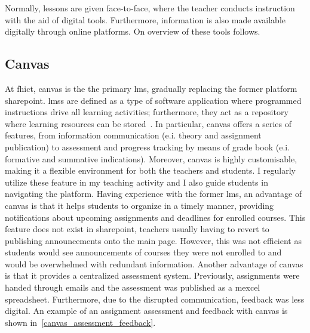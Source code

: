Normally, lessons are given face-to-face, where the teacher conducts instruction with the aid of digital tools. 
Furthermore, information is also made available digitally through online platforms.   
On overview of these tools follows.

\subsection{Canvas}

At \acrshort{fhict}, \Gls{canvas} is the the primary \acrfull{lms}, gradually replacing the former platform \Gls{sharepoint}. 
\acrshort{lms}s are defined as a type of software application where programmed instructions drive all learning activities; furthermore, they act as a repository where learning resources can be stored~\cite{lms2020}. 
In particular, \Gls{canvas} offers a series of features, from information communication (e.i. theory and assignment publication) to assessment and progress tracking by means of grade book (e.i. formative and summative indications). 
Moreover, \Gls{canvas} is highly customisable, making it a flexible environment for both the teachers and students.
I regularly utilize these feature in my teaching activity and I also guide students in navigating the platform. 
Having experience with the former \acrshort{lms}, an advantage of \Gls{canvas} is that it helps students to organize in a timely manner, providing notifications about upcoming assignments and deadlines for enrolled courses. 
This feature does not exist in \Gls{sharepoint}, teachers usually having to revert to publishing announcements onto the main page. 
However, this was not efficient as students would see announcements of courses they were not enrolled to and would be overwhelmed with redundant information.
Another advantage of \Gls{canvas} is that it provides a centralized assessment system. 
Previously, assignments were handed through emails and the assessment was published as a \Gls{mexcel} spreadsheet. 
Furthermore, due to the disrupted communication, feedback was less digital. 
An example of an assignment assessment and feedback with \Gls{canvas} is shown in~\cref{canvas_assessment_feedback}.

